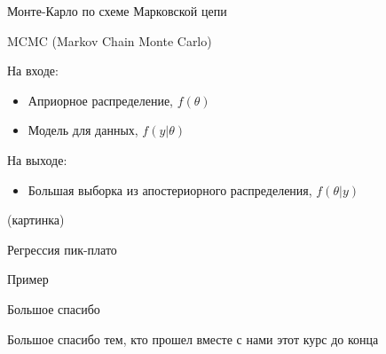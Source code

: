\documentclass[ignorenonframetext,]{beamer}
\begin{document}
\begin{frame}{Монте-Карло по схеме Марковской цепи}

MCMC (Markov Chain Monte Carlo)

На входе:

\begin{itemize}
\item
  Априорное распределение, \(f(\theta)\)
\item
  Модель для данных, \(f(y|\theta)\)
\end{itemize}

На выходе:

\begin{itemize}
\itemsep1pt\parskip0pt
\item
  Большая выборка из апостериорного распределения, \(f(\theta|y)\)
\end{itemize}

(картинка)

\end{frame}

\begin{frame}{Регрессия пик-плато}

\end{frame}

\begin{frame}{Пример}

\end{frame}

\begin{frame}{Большое спасибо}

Большое спасибо тем, кто прошел вместе с нами этот курс до конца

\end{frame}
\end{document}
